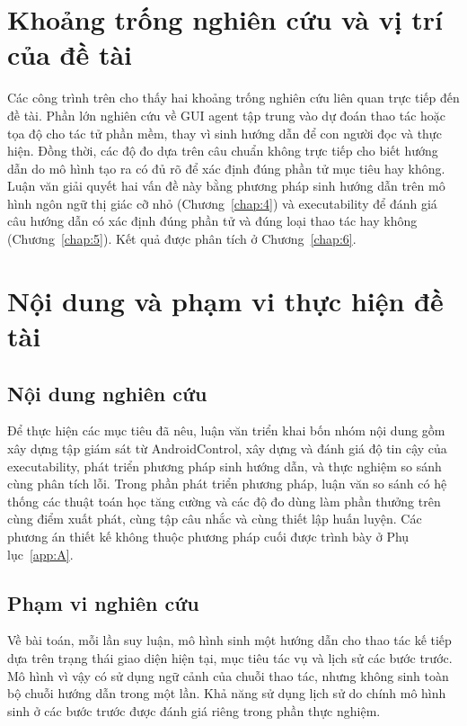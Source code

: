 \section{Khoảng trống nghiên cứu và vị trí của đề tài}\label{sec:1.4}

Các công trình trên cho thấy hai khoảng trống nghiên cứu liên quan trực tiếp đến đề tài. Phần lớn nghiên cứu về GUI agent tập trung vào dự đoán thao tác hoặc tọa độ cho tác tử phần mềm, thay vì sinh hướng dẫn để con người đọc và thực hiện. Đồng thời, các độ đo dựa trên câu chuẩn không trực tiếp cho biết hướng dẫn do mô hình tạo ra có đủ rõ để xác định đúng phần tử mục tiêu hay không. Luận văn giải quyết hai vấn đề này bằng phương pháp sinh hướng dẫn trên mô hình ngôn ngữ thị giác cỡ nhỏ (Chương~\ref{chap:4}) và executability để đánh giá câu hướng dẫn có xác định đúng phần tử và đúng loại thao tác hay không (Chương~\ref{chap:5}). Kết quả được phân tích ở Chương~\ref{chap:6}.

\section{Nội dung và phạm vi thực hiện đề tài}\label{sec:1.5}

\subsection{Nội dung nghiên cứu}\label{sec:1.5.1}

Để thực hiện các mục tiêu đã nêu, luận văn triển khai bốn nhóm nội dung gồm xây dựng tập giám sát từ AndroidControl, xây dựng và đánh giá độ tin cậy của executability, phát triển phương pháp sinh hướng dẫn, và thực nghiệm so sánh cùng phân tích lỗi. Trong phần phát triển phương pháp, luận văn so sánh có hệ thống các thuật toán học tăng cường và các độ đo dùng làm phần thưởng trên cùng điểm xuất phát, cùng tập câu nhắc và cùng thiết lập huấn luyện. Các phương án thiết kế không thuộc phương pháp cuối được trình bày ở Phụ lục~\ref{app:A}.

\subsection{Phạm vi nghiên cứu}\label{sec:1.5.2}

Về bài toán, mỗi lần suy luận, mô hình sinh một hướng dẫn cho thao tác kế tiếp dựa trên trạng thái giao diện hiện tại, mục tiêu tác vụ và lịch sử các bước trước. Mô hình vì vậy có sử dụng ngữ cảnh của chuỗi thao tác, nhưng không sinh toàn bộ chuỗi hướng dẫn trong một lần. Khả năng sử dụng lịch sử do chính mô hình sinh ở các bước trước được đánh giá riêng trong phần thực nghiệm.

